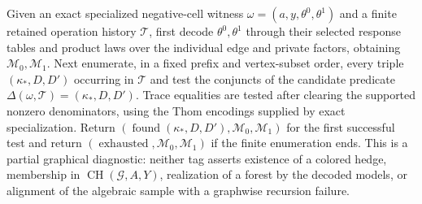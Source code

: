 Given an exact specialized negative-cell witness \(\omega=(a,y,\theta^0,\theta^1)\) and a finite retained operation history \(\mathcal T\), first decode \(\theta^0,\theta^1\) through their selected response tables and product laws over the individual edge and private factors, obtaining \(\mathcal M_0,\mathcal M_1\). Next enumerate, in a fixed prefix and vertex-subset order, every triple \((\kappa_*,D,D')\) occurring in \(\mathcal T\) and test the conjuncts of the candidate predicate \(\Delta(\omega,\mathcal T)=(\kappa_*,D,D')\). Trace equalities are tested after clearing the supported nonzero denominators, using the Thom encodings supplied by exact specialization. Return \((\operatorname{found}(\kappa_*,D,D'),\mathcal M_0,\mathcal M_1)\) for the first successful test and return \((\operatorname{exhausted},\mathcal M_0,\mathcal M_1)\) if the finite enumeration ends. This is a partial graphical diagnostic: neither tag asserts existence of a colored hedge, membership in \(\operatorname{CH}(\mathcal G,A,Y)\), realization of a forest by the decoded models, or alignment of the algebraic sample with a graphwise recursion failure.